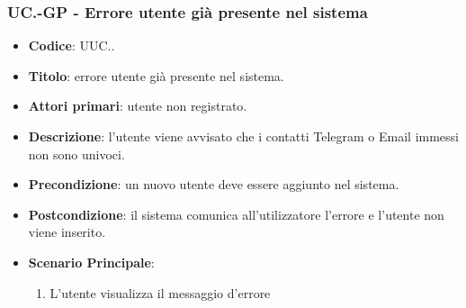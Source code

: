 	\subsubsection{UC\theuccount.\thesubuccount-GP - Errore utente già presente nel sistema}
		
		\begin{itemize}
			\item \textbf{Codice}: UUC\theuccount.\thesubuccount.
			\item \textbf{Titolo}: errore utente già presente nel sistema.
			\item \textbf{Attori primari}: utente non registrato.
			\item \textbf{Descrizione}: l’utente viene avvisato che i contatti Telegram o Email immessi non sono univoci.
			\item \textbf{Precondizione}: un nuovo utente deve essere aggiunto nel sistema.
			\item \textbf{Postcondizione}: il sistema comunica all’utilizzatore l’errore e l'utente non viene inserito.
			\item \textbf{Scenario Principale}:
			\begin{enumerate}
				\item L'utente visualizza il messaggio d'errore
			\end{enumerate}
			\end{itemize}